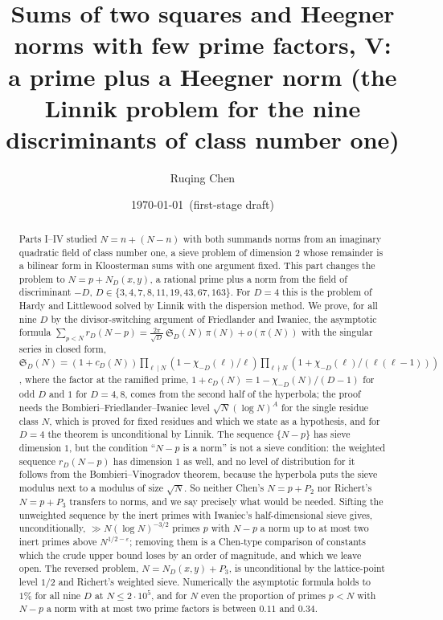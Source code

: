 \documentclass[11pt]{amsart}
\title[A prime plus a Heegner norm]{Sums of two squares and Heegner norms with few prime factors, V:\\ a prime plus a Heegner norm (the Linnik problem for the nine discriminants of class number one)}
\author{Ruqing Chen}
\date{\today\ (first-stage draft)}
\theoremstyle{definition}
\theoremstyle{remark}
\newcommand{\e}{\varepsilon}
\newcommand{\sS}{\mathfrak S}
\begin{document}
\begin{abstract}
Parts I--IV studied $N=n+(N-n)$ with both summands norms from an imaginary quadratic field of class number one, a sieve problem of dimension $2$ whose remainder is a bilinear form in Kloosterman sums with one argument fixed. This part changes the problem to $N=p+N_D(x,y)$, a rational prime plus a norm from the field of discriminant $-D$, $D\in\{3,4,7,8,11,19,43,67,163\}$. For $D=4$ this is the problem of Hardy and Littlewood solved by Linnik with the dispersion method. We prove, for all nine $D$ by the divisor-switching argument of Friedlander and Iwaniec, the asymptotic formula $\sum_{p<N}r_D(N-p)=\frac{2\pi}{\sqrt D}\,\sS_D(N)\,\pi(N)+o(\pi(N))$ with the singular series in closed form, $\sS_D(N)=(1+c_D(N))\prod_{\ell\mid N}(1-\chi_{-D}(\ell)/\ell)\prod_{\ell\nmid N}(1+\chi_{-D}(\ell)/(\ell(\ell-1)))$, where the factor at the ramified prime, $1+c_D(N)=1-\chi_{-D}(N)/(D-1)$ for odd $D$ and $1$ for $D=4,8$, comes from the second half of the hyperbola; the proof needs the Bombieri--Friedlander--Iwaniec level $\sqrt N(\log N)^A$ for the single residue class $N$, which is proved for fixed residues and which we state as a hypothesis, and for $D=4$ the theorem is unconditional by Linnik. The sequence $\{N-p\}$ has sieve dimension $1$, but the condition ``$N-p$ is a norm'' is not a sieve condition: the weighted sequence $r_D(N-p)$ has dimension $1$ as well, and no level of distribution for it follows from the Bombieri--Vinogradov theorem, because the hyperbola puts the sieve modulus next to a modulus of size $\sqrt N$. So neither Chen's $N=p+P_2$ nor Richert's $N=p+P_3$ transfers to norms, and we say precisely what would be needed. Sifting the unweighted sequence by the inert primes with Iwaniec's half-dimensional sieve gives, unconditionally, $\gg N(\log N)^{-3/2}$ primes $p$ with $N-p$ a norm up to at most two inert primes above $N^{1/2-\e}$; removing them is a Chen-type comparison of constants which the crude upper bound loses by an order of magnitude, and which we leave open. The reversed problem, $N=N_D(x,y)+P_3$, is unconditional by the lattice-point level $1/2$ and Richert's weighted sieve. Numerically the asymptotic formula holds to $1\%$ for all nine $D$ at $N\le2\cdot10^5$, and for $N$ even the proportion of primes $p<N$ with $N-p$ a norm with at most two prime factors is between $0.11$ and $0.34$.
\end{abstract}

\maketitle
\end{document}
